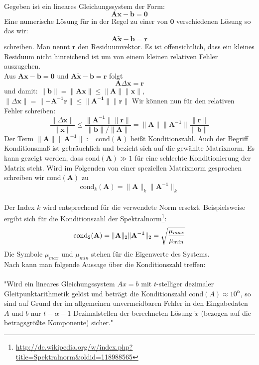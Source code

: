 %
Gegeben ist ein lineares Gleichungssystem der Form:
$$ \mathbf{A}\mathbf{x}-\mathbf{b} =\mathbf{0} $$
Eine numerische Lösung für in der Regel zu einer von $\mathbf{0}$ verschiedenen Lösung so das wir:
$$ \mathbf{A}\mathbf{\tilde{x}}-\mathbf{b} =\mathbf{r} $$
schreiben. Man nennt $\mathbf{r}$ den Residuumvektor. Es ist offensichtlich, dass ein kleines Residuum nicht hinreichend ist um von einem kleinen relativen Fehler auszugehen.\\
Aus $\mathbf{A}\mathbf{x}-\mathbf{b} =\mathbf{0}$ und $\mathbf{A}\mathbf{\tilde{x}}-\mathbf{b} =\mathbf{r}$ folgt $$ \mathbf{A}\Delta\mathbf{x}=\mathbf{r}$$
und damit:
$ 
\lVert \mathbf{b} \rVert=\lVert \mathbf{Ax} \rVert \leq \lVert \mathbf{A} \rVert \lVert \mathbf{x} \rVert
$, 
$
\lVert \Delta\mathbf{x} \rVert=\lVert -\mathbf{A^{-1}r} \rVert \leq \lVert \mathbf{A^{-1}} \rVert \lVert \mathbf{r} \rVert
$
Wir können nun für den relativen Fehler schreiben:
$$
\frac{\lVert \Delta\mathbf{x} \rVert}{\lVert \mathbf{x} \rVert} \leq 
\frac{\lVert \mathbf{A^{-1}} \rVert \lVert \mathbf{r} \rVert}{\lVert \mathbf{b} \rVert / \lVert \mathbf{A} \rVert} =
\lVert \mathbf{A} \rVert \lVert \mathbf{A^{-1}} \rVert \frac{\lVert \mathbf{r} \rVert}{\lVert \mathbf{b} \rVert}
$$
Der Term $\lVert \mathbf{A} \rVert \lVert \mathbf{A^{-1}} \rVert := \text{cond}(\mathbf{A})$ heißt Konditionszahl. Auch der Begriff Konditionsmaß ist gebräuchlich und bezieht sich auf die gewählte Matrixnorm.
Es kann gezeigt werden, dass $\text{cond}(\mathbf{A}) \gg 1$  für eine schlechte Konditionierung der Matrix steht. Wird im Folgenden von einer speziellen Matrixnorm gesprochen schreiben wir $\text{cond}(\mathbf{A})$ zu 
$$ 
\text{cond}_k(\mathbf{A}) = \lVert \mathbf{A} \rVert_k \lVert \mathbf{A^{-1}} \rVert_k
$$ \\
Der Index $k$ wird entsprechend für die verwendete Norm ersetzt. Beispielsweise ergibt sich für die Konditionszahl der Spektralnorm\footnote{\url{http://de.wikipedia.org/w/index.php?title=Spektralnorm&oldid=118988565}}:
$$ 
\text{cond}_2(\mathbf{A}) = \lVert \mathbf{A} \rVert_2 \lVert \mathbf{A^{-1}} \rVert_2=
\sqrt{\frac{\mu_{max}}{\mu_{min}}}\\
$$
Die Symbole $\mu_{max}$ und $\mu_{min}$ stehen für die Eigenwerte des Systems.\\
Nach \cite{hermann2001numerische} kann man folgende Aussage über die Konditionszahl treffen:\\
\\
"Wird ein lineares Gleichungssystem $Ax=b$ mit $t$-stelliger dezimaler Gleitpunktarithmetik gelöst und beträgt die Konditionszahl $\text{cond}(A) \approx10^\alpha$, so sind auf Grund der im allgemeinen unvermeidbaren Fehler in den Eingabedaten $A$ und $b$ nur $t-\alpha-1$ Dezimalstellen der berechneten Lösung $\tilde{x}$ (bezogen auf die betragsgrößte Komponente) sicher."